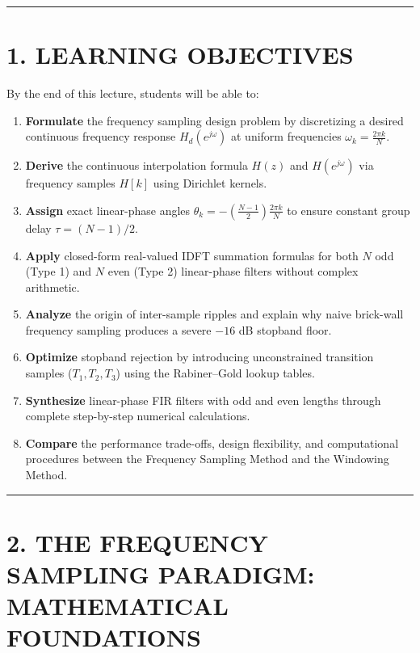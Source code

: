 \documentclass[11pt,a4paper]{article}
\begin{document}
\noindent\rule{\textwidth}{0.5pt}

\section{1. LEARNING OBJECTIVES}
By the end of this lecture, students will be able to:
\begin{enumerate}
    \item \textbf{Formulate} the frequency sampling design problem by discretizing a desired continuous frequency response $H_d(e^{j\omega})$ at uniform frequencies $\omega_k = \frac{2\pi k}{N}$.
    \item \textbf{Derive} the continuous interpolation formula $H(z)$ and $H(e^{j\omega})$ via frequency samples $H[k]$ using Dirichlet kernels.
    \item \textbf{Assign} exact linear-phase angles $\theta_k = -\left(\frac{N-1}{2}\right)\frac{2\pi k}{N}$ to ensure constant group delay $\tau = (N-1)/2$.
    \item \textbf{Apply} closed-form real-valued IDFT summation formulas for both $N$ odd (Type 1) and $N$ even (Type 2) linear-phase filters without complex arithmetic.
    \item \textbf{Analyze} the origin of inter-sample ripples and explain why naive brick-wall frequency sampling produces a severe $-16$ dB stopband floor.
    \item \textbf{Optimize} stopband rejection by introducing unconstrained transition samples ($T_1, T_2, T_3$) using the Rabiner--Gold lookup tables.
    \item \textbf{Synthesize} linear-phase FIR filters with odd and even lengths through complete step-by-step numerical calculations.
    \item \textbf{Compare} the performance trade-offs, design flexibility, and computational procedures between the Frequency Sampling Method and the Windowing Method.
\end{enumerate}

\noindent\rule{\textwidth}{0.5pt}

\section{2. THE FREQUENCY SAMPLING PARADIGM: MATHEMATICAL FOUNDATIONS}
\end{document}

